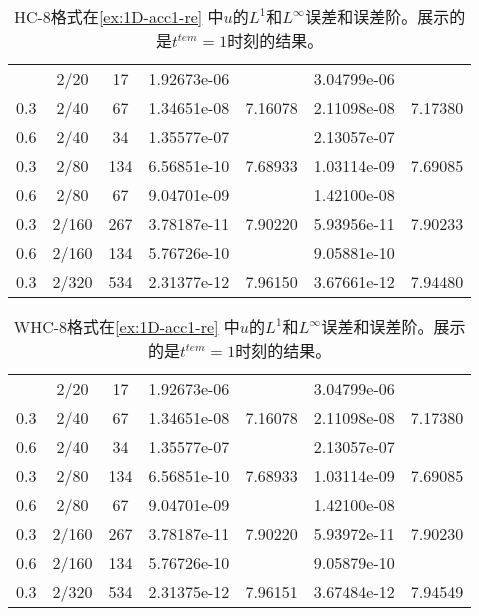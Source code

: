 \begin{table}[htbp]
	\caption{HC-8格式在\cref{ex:1D-acc1-re} 中$u$的$L^1$和$L^\infty$误差和误差阶。展示的是$t^{tem} = 1$时刻的结果。}
	\label{ta:1D-ex1-HC8}
	\centering
	\begin{tabular}{ccccccc}
		\toprule
		\titleintable
		\midrule
		0.6 & 2/20  & 17  & 1.92673e-06 &         & 3.04799e-06 &         \\
		0.3 & 2/40  & 67  & 1.34651e-08 & 7.16078 & 2.11098e-08 & 7.17380 \\
		\midrule
		0.6 & 2/40  & 34  & 1.35577e-07 &         & 2.13057e-07 &         \\
		0.3 & 2/80  & 134 & 6.56851e-10 & 7.68933 & 1.03114e-09 & 7.69085 \\
		\midrule
		0.6 & 2/80  & 67  & 9.04701e-09 &         & 1.42100e-08 &         \\
		0.3 & 2/160 & 267 & 3.78187e-11 & 7.90220 & 5.93956e-11 & 7.90233 \\
		\midrule
		0.6 & 2/160 & 134 & 5.76726e-10 &         & 9.05881e-10 &         \\
		0.3 & 2/320 & 534 & 2.31377e-12 & 7.96150 & 3.67661e-12 & 7.94480 \\
		\bottomrule
	\end{tabular}
\end{table}

\begin{table}[htbp]
	\caption{WHC-8格式在\cref{ex:1D-acc1-re} 中$u$的$L^1$和$L^\infty$误差和误差阶。展示的是$t^{tem} = 1$时刻的结果。}
	\label{ta:1D-ex1-WHC8}
	\centering
	\begin{tabular}{ccccccc}
		\toprule
		\titleintable
		\midrule
		0.6 & 2/20  & 17  & 1.92673e-06 &         & 3.04799e-06 &         \\
		0.3 & 2/40  & 67  & 1.34651e-08 & 7.16078 & 2.11098e-08 & 7.17380 \\
		\midrule
		0.6 & 2/40  & 34  & 1.35577e-07 &         & 2.13057e-07 &         \\
		0.3 & 2/80  & 134 & 6.56851e-10 & 7.68933 & 1.03114e-09 & 7.69085 \\
		\midrule
		0.6 & 2/80  & 67  & 9.04701e-09 &         & 1.42100e-08 &         \\
		0.3 & 2/160 & 267 & 3.78187e-11 & 7.90220 & 5.93972e-11 & 7.90230 \\
		\midrule
		0.6 & 2/160 & 134 & 5.76726e-10 &         & 9.05879e-10 &         \\
		0.3 & 2/320 & 534 & 2.31375e-12 & 7.96151 & 3.67484e-12 & 7.94549 \\
		\bottomrule
	\end{tabular}
\end{table}


